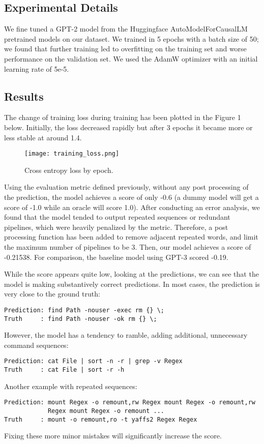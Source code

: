 \subsection{Experimental Details}
We fine tuned a GPT-2 model from the Huggingface AutoModelForCausalLM
pretrained models on our dataset. We trained in 5 epochs with a batch size of
50; we found that further training led to overfitting on the training set and
worse performance on the validation set. We used the AdamW optimizer with an
initial learning rate of 5e-5.

\subsection{Results}
The change of training loss during training has been plotted in the Figure 1
below. Initially, the loss decreased rapidly but after 3 epochs it became more
or less stable at around 1.4.

\begin{figure}[ht!]
	\centering
	\texttt{[image: training\_loss.png]}
	\caption{Cross entropy loss by epoch.}
	\label{overfitting}
\end{figure}
\par
Using the evaluation metric defined previously, without any post processing of
the prediction, the model achieves a score of only -0.6 (a dummy model will get
a score of -1.0 while an oracle will score 1.0). After conducting an error
analysis, we found that the model tended to output repeated sequences or
redundant pipelines, which were heavily penalized by the metric. Therefore, a
post processing function has been added to remove adjacent repeated words, and
limit the maximum number of pipelines to be 3. Then, our model achieves a score
of -0.21538. For comparison, the baseline model using GPT-3 scored -0.19.
\par
While the score appears quite low, looking at the predictions, we can see that
the model is making substantively correct predictions. In most cases, the
prediction is very close to the ground truth:
\begin{verbatim}
Prediction: find Path -nouser -exec rm {} \;
Truth     : find Path -nouser -ok rm {} \; 
\end{verbatim}
However, the model has a tendency to ramble, adding additional, unnecessary command sequences:
\begin{verbatim}
Prediction: cat File | sort -n -r | grep -v Regex
Truth     : cat File | sort -r -h 
\end{verbatim}
Another example with repeated sequences:
\begin{verbatim}
Prediction: mount Regex -o remount,rw Regex mount Regex -o remount,rw 
            Regex mount Regex -o remount ...
Truth     : mount -o remount,ro -t yaffs2 Regex Regex 
\end{verbatim}
Fixing these more minor mistakes will significantly increase the score.
